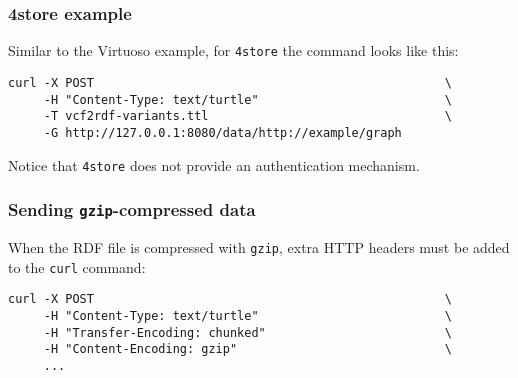 \subsubsection{4store example}

Similar to the Virtuoso example, for \texttt{4store} the command looks like
this:

\begin{siderules}
\begin{verbatim}
curl -X POST                                                 \
     -H "Content-Type: text/turtle"                          \
     -T vcf2rdf-variants.ttl                                 \
     -G http://127.0.0.1:8080/data/http://example/graph
\end{verbatim}
\end{siderules}

Notice that \texttt{4store} does not provide an authentication mechanism.

\subsubsection{Sending \texttt{gzip}-compressed data}

  When the RDF file is compressed with \texttt{gzip}, extra HTTP headers must
  be added to the \texttt{curl} command:
\begin{siderules}
\begin{verbatim}
curl -X POST                                                 \
     -H "Content-Type: text/turtle"                          \
     -H "Transfer-Encoding: chunked"                         \
     -H "Content-Encoding: gzip"                             \
     ...
\end{verbatim}
\end{siderules}
